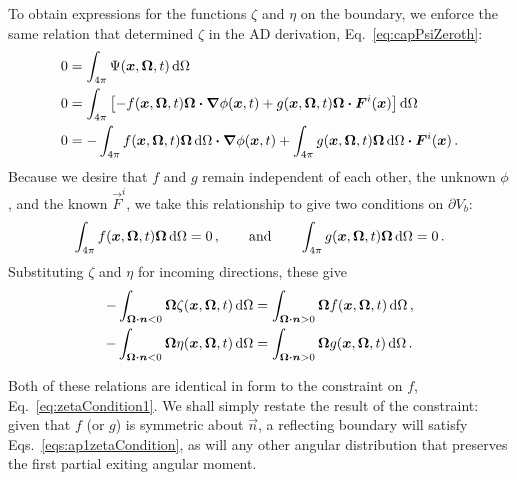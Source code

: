 To obtain expressions for the functions $\zeta$ and $\eta$ on the boundary, we enforce the same relation that determined
$\zeta$ in the AD derivation, Eq.~\eqref{eq:capPsiZeroth}:
\begin{align*}
  0 &= \int_{4\pi} \Psi(\bm{x}, \bm{\Omega}, t) \mathop{}\!\mathrm{d}\Omega
  \\
  0 &= \int_{4\pi} \left[  - f(\bm{x}, \bm{\Omega}, t) \bm{\Omega}\bm{\cdot} \bm{\nabla} \phi(\bm{x}, t)
+ g(\bm{x}, \bm{\Omega}, t) \bm{\Omega}\bm{\cdot} \bm{F}^i(\bm{x})
 \right]  \mathop{}\!\mathrm{d}\Omega
  \\
  0 &=
- \int_{4\pi} f(\bm{x}, \bm{\Omega}, t) \bm{\Omega} \mathop{}\!\mathrm{d}\Omega
  \bm{\cdot} \bm{\nabla} \phi(\bm{x}, t)
+ \int_{4\pi} g(\bm{x}, \bm{\Omega}, t) \bm{\Omega} \mathop{}\!\mathrm{d}\Omega
  \bm{\cdot} \bm{F}^i(\bm{x}) \,.
\end{align*}
Because we desire that $f$ and $g$ remain independent of each other, the unknown
$\phi$, and the known $\vec{F}^i$, we take this relationship to give two
conditions on $\partial V_b$:
\begin{equation*}
  \int_{4\pi} f(\bm{x}, \bm{\Omega}, t) \bm{\Omega} \mathop{}\!\mathrm{d}\Omega = 0\,,
  \qquad \text{and} \qquad
  \int_{4\pi} g(\bm{x}, \bm{\Omega}, t) \bm{\Omega} \mathop{}\!\mathrm{d}\Omega = 0\,.
\end{equation*}
Substituting $\zeta$ and $\eta$ for incoming directions, these give
\begin{subequations} \label{eqs:ap1zetaCondition}
\begin{align} \label{eq:ap1zetaCondition}
- \int_{\bm{\Omega} \bm{\cdot} \bm{n} < 0}
 \bm{\Omega} \zeta(\bm{x}, \bm{\Omega}, t)\mathop{}\!\mathrm{d}\Omega
 &=
 \int_{\bm{\Omega} \bm{\cdot} \bm{n} > 0}
  \bm{\Omega} f(\bm{x}, \bm{\Omega}, t)\mathop{}\!\mathrm{d}\Omega \,,
\\ \label{eq:ap1etaCondition}
- \int_{\bm{\Omega} \bm{\cdot} \bm{n} < 0}
 \bm{\Omega} \eta(\bm{x}, \bm{\Omega}, t)\mathop{}\!\mathrm{d}\Omega
 &=
 \int_{\bm{\Omega} \bm{\cdot} \bm{n} > 0}
  \bm{\Omega} g(\bm{x}, \bm{\Omega}, t)\mathop{}\!\mathrm{d}\Omega \,.
\end{align}
\end{subequations}

Both of these relations are identical in form to the constraint on $f$,
Eq.~\eqref{eq:zetaCondition1}. We shall simply restate the result of the
constraint: given that $f$ (or $g$) is symmetric about $\vec{n}$, a reflecting
boundary will satisfy Eqs.~\eqref{eqs:ap1zetaCondition}, as will any other
angular distribution that preserves the first partial exiting angular moment.

